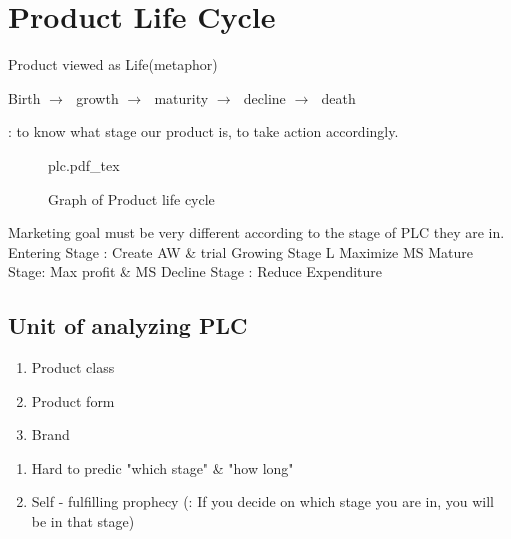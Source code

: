\documentclass[12pt]{article}
\newcommand{\ra}{$\rightarrow \text{ }$}
\begin{document}
\section{Product Life Cycle}
\begin{tcolorbox}
	Product viewed as Life(metaphor)

	Birth \ra growth \ra maturity \ra decline \ra death

\end{tcolorbox}
: {\large to know what stage our product is, to take action accordingly.}

\begin{figure}[H]
	\centering
	\def\svgwidth{\columnwidth}
	{plc.pdf_tex}
	\caption{Graph of Product life cycle}
	\label{fig:plc}
\end{figure}

Marketing goal must be very different according to the stage of PLC they are in.
Entering Stage : Create AW & trial
Growing Stage L Maximize MS
Mature Stage: Max profit & MS
Decline Stage : Reduce Expenditure

\subsection{Unit of analyzing PLC}
\begin{enumerate}
	\item Product class
	\item Product form
	\item Brand
\end{enumerate}

\begin{center}
	\begin{enumerate}
		\item Hard to predic "which stage" & "how long"
		\item Self - fulfilling prophecy (: If you decide on which stage you are in, you will be in that stage)
	\end{enumerate}

\end{center}
\end{document}

